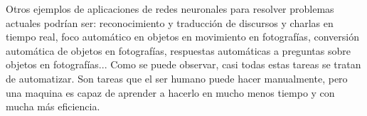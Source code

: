 Otros ejemplos de aplicaciones de redes neuronales para resolver problemas actuales podrían ser: reconocimiento y traducción de discursos y charlas en tiempo real, foco automático en objetos en movimiento en fotografías, conversión automática de objetos en fotografías, respuestas automáticas a preguntas sobre objetos en fotografías... Como se puede observar, casi todas estas tareas se tratan de automatizar. Son tareas que el ser humano puede hacer manualmente, pero una maquina es capaz de aprender a hacerlo en mucho menos tiempo y con mucha más eficiencia.





